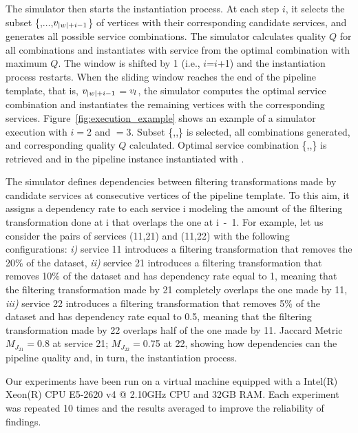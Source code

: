 The simulator then starts the instantiation process. At each step $i$, it selects the subset \{,$\ldots$,$v_{|w|+i-1}$\} of vertices with their corresponding candidate services, and generates all possible service combinations. The simulator calculates quality $Q$ for all combinations and instantiates  with service  from the optimal combination with maximum $Q$. The window is shifted by 1 (i.e., $i$=$i$+1) and the instantiation process restarts. When the sliding window reaches the end of the pipeline template, that is, $v_{|w|+i-1}$$=$$v_{l}$, the simulator computes the optimal service combination and instantiates the remaining vertices with the corresponding services.
Figure~\ref{fig:execution_example} shows an example of a simulator execution with $i$$=$2 and \windowsize$=$3. Subset \{,,\} is selected, all combinations generated, and corresponding quality $Q$ calculated. Optimal service combination \{,,\} is retrieved and  in the pipeline instance instantiated with .

The simulator defines dependencies between filtering transformations made by candidate services at consecutive vertices of the pipeline template. To this aim, it assigns a dependency rate to each service \si{i} modeling the amount of the filtering transformation done at \si{i} that overlaps the one at \si{i-1}.
For example, let us consider the pairs of services (\si{11},\si{21}) and (\si{11},\si{22}) with the following configurations: \emph{i)} service \si{11} introduces a filtering transformation that removes the 20\% of the dataset, \emph{ii)} service \si{21} introduces a filtering transformation that removes 10\% of the dataset and has dependency rate equal to 1, meaning that the filtering transformation made by \si{21} completely overlaps the one made by \si{11}, \emph{iii)} service \si{22} introduces a filtering transformation that removes 5\% of the dataset and has dependency rate equal to 0.5, meaning that the filtering transformation made by \si{22} overlaps half of the one made by \si{11}. Jaccard Metric $M_{J_{21}}$$=$0.8 at service \si{21}; $M_{J_{22}}$$=$0.75 at \si{22}, showing how dependencies can the pipeline quality and, in turn, the instantiation process.


Our experiments have been run on a virtual machine equipped with a Intel(R) Xeon(R) CPU E5-2620 v4 @ 2.10GHz CPU and 32GB RAM.
Each experiment was repeated 10 times and the results averaged to improve the reliability of findings.

